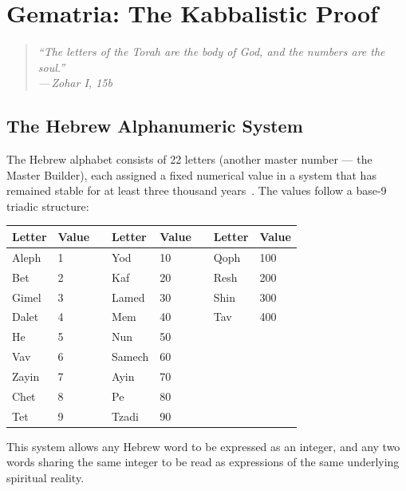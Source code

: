 \documentclass[12pt, a4paper]{article}
\newcommand{\epigraph}[2]{%
  \begin{quote}
    \itshape ``#1''\\[0.3em]
    \normalfont\small\hfill ---\,#2
  \end{quote}
}
\begin{document}
\section{Gematria: The Kabbalistic Proof}
\label{sec:gematria}

\epigraph{The letters of the Torah are the body of God, and the numbers are
the soul.}{Zohar I, 15b}

\subsection{The Hebrew Alphanumeric System}

The Hebrew alphabet consists of 22 letters (another master number — the Master
Builder), each assigned a fixed numerical value in a system that has remained
stable for at least three thousand
years~\autocite{tav2016}. The values follow a base-9 triadic structure:

\begin{center}
\begin{tabular}{C{2.5cm} C{1.5cm} C{0.3cm} C{2.5cm} C{1.5cm} C{0.3cm} C{2.5cm} C{1.5cm}}
\toprule
\textbf{Letter} & \textbf{Value} & & \textbf{Letter} & \textbf{Value} & & \textbf{Letter} & \textbf{Value} \\
\midrule
Aleph & 1   & & Yod    & 10  & & Qoph  & 100 \\
Bet   & 2   & & Kaf    & 20  & & Resh  & 200 \\
Gimel & 3   & & Lamed  & 30  & & Shin  & 300 \\
Dalet & 4   & & Mem    & 40  & & Tav   & 400 \\
He    & 5   & & Nun    & 50  & &       &     \\
Vav   & 6   & & Samech & 60  & &       &     \\
Zayin & 7   & & Ayin   & 70  & &       &     \\
Chet  & 8   & & Pe     & 80  & &       &     \\
Tet   & 9   & & Tzadi  & 90  & &       &     \\
\bottomrule
\end{tabular}
\end{center}

\vspace{1em}

This system allows any Hebrew word to be expressed as an integer, and any two
words sharing the same integer to be read as expressions of the same underlying
spiritual reality.
\end{document}
